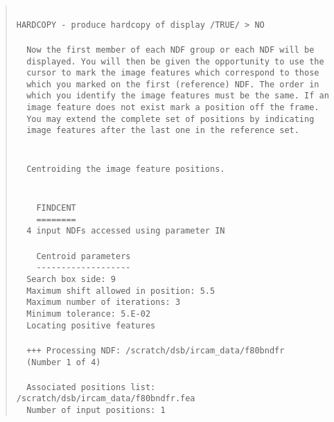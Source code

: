\begin{quote}
\begin{tabbing}
\verb##\\
\verb#HARDCOPY - produce hardcopy of display /TRUE/ > NO# \\
\verb##\\
\verb#  Now the first member of each NDF group or each NDF will be#\\
\verb#  displayed. You will then be given the opportunity to use the#\\
\verb#  cursor to mark the image features which correspond to those#\\
\verb#  which you marked on the first (reference) NDF. The order in#\\
\verb#  which you identify the image features must be the same. If an#\\
\verb#  image feature does not exist mark a position off the frame.#\\
\verb#  You may extend the complete set of positions by indicating#\\
\verb#  image features after the last one in the reference set.#\\
\verb##\\
\verb##\\
\verb#  Centroiding the image feature positions.#\\
\verb##\\
\verb##\\
\verb#    FINDCENT#\\
\verb#    ========#\\
\verb#  4 input NDFs accessed using parameter IN#\\
\verb##\\
\verb#    Centroid parameters#\\
\verb#    -------------------#\\
\verb#  Search box side: 9#\\
\verb#  Maximum shift allowed in position: 5.5#\\
\verb#  Maximum number of iterations: 3#\\
\verb#  Minimum tolerance: 5.E-02#\\
\verb#  Locating positive features#\\
\verb##\\
\verb#  +++ Processing NDF: /scratch/dsb/ircam_data/f80bndfr#\\
\verb#  (Number 1 of 4)#\\
\verb##\\
\verb#  Associated positions list: /scratch/dsb/ircam_data/f80bndfr.fea#\\
\verb#  Number of input positions: 1#\\

\end{tabbing}
\end{quote}
